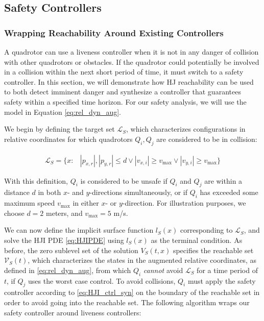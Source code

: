 \subsection{Safety Controllers \label{sec:safety}}
\subsubsection{Wrapping Reachability Around Existing Controllers}
A quadrotor can use a liveness controller when it is not in any danger of collision with other quadrotors or obstacles. If the quadrotor could potentially be involved in a collision within the next short period of time, it must switch to a safety controller. In this section, we will demonstrate how HJ reachability can be used to both detect imminent danger and synthesize a controller that guarantees safety within a specified time horizon. For our safety analysis, we will use the model in Equation \eqref{eq:rel_dyn_aug}.

We begin by defining the target set $\mathcal{L}_S$, which characterizes configurations in relative coordinates for which quadrotors $Q_i,Q_j$ are considered to be in collision:

\begin{equation}
\begin{aligned}
\mathcal{L}_S = \{x: &|p_{x,r}|, |p_{y,r}|\le d \vee |v_{x,i}| \ge v_\text{max} \vee |v_{y,i}| \ge v_\text{max} \}
\end{aligned}
\end{equation}

With this definition, $Q_i$ is considered to be unsafe if $Q_i$ and $Q_j$ are within a distance $d$ in both $x$- and $y$-directions simultaneously, or if $Q_i$ has exceeded some maximum speed $v_\text{max}$ in either $x$- or $y$-direction. For illustration purposes, we choose $d=2$ meters, and $v_\text{max}= 5$ m/s.

We can now define the implicit surface function $l_S(x)$ corresponding to $\mathcal{L}_S$, and solve the HJI PDE \eqref{eq:HJIPDE} using $l_S(x)$ as the terminal condition. As before, the zero sublevel set of the solution $V_S(t,x)$ specifies the reachable set $\mathcal{V}_S(t)$, which characterizes the states in the augmented relative coordinates, as defined in \eqref{eq:rel_dyn_aug}, from which $Q_i$ \textit{cannot} avoid $\mathcal{L}_S$ for a time period of $t$, if $Q_j$ uses the worst case control. To avoid collisions, $Q_i$ must apply the safety controller according to \eqref{eq:HJI_ctrl_syn} on the boundary of the reachable set in order to avoid going into the reachable set. The following algorithm wraps our safety controller around liveness controllers:

